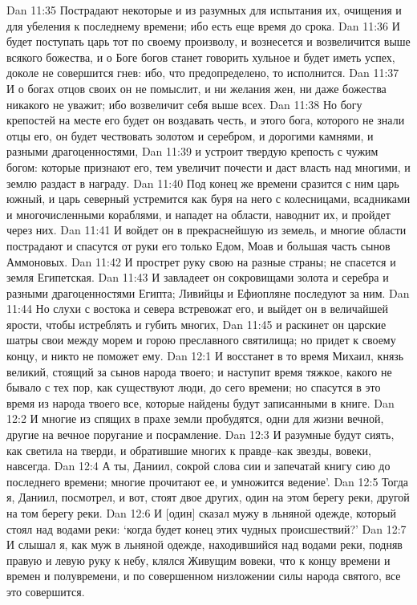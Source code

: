 Dan 11:35  Пострадают некоторые и из разумных для испытания их, очищения и для убеления к последнему времени; ибо есть еще время до срока.
Dan 11:36  И будет поступать царь тот по своему произволу, и вознесется и возвеличится выше всякого божества, и о Боге богов станет говорить хульное и будет иметь успех, доколе не совершится гнев: ибо, что предопределено, то исполнится.
Dan 11:37  И о богах отцов своих он не помыслит, и ни желания жен, ни даже божества никакого не уважит; ибо возвеличит себя выше всех.
Dan 11:38  Но богу крепостей на месте его будет он воздавать честь, и этого бога, которого не знали отцы его, он будет чествовать золотом и серебром, и дорогими камнями, и разными драгоценностями,
Dan 11:39  и устроит твердую крепость с чужим богом: которые признают его, тем увеличит почести и даст власть над многими, и землю раздаст в награду.
Dan 11:40  Под конец же времени сразится с ним царь южный, и царь северный устремится как буря на него с колесницами, всадниками и многочисленными кораблями, и нападет на области, наводнит их, и пройдет через них.
Dan 11:41  И войдет он в прекраснейшую из земель, и многие области пострадают и спасутся от руки его только Едом, Моав и большая часть сынов Аммоновых.
Dan 11:42  И прострет руку свою на разные страны; не спасется и земля Египетская.
Dan 11:43  И завладеет он сокровищами золота и серебра и разными драгоценностями Египта; Ливийцы и Ефиопляне последуют за ним.
Dan 11:44  Но слухи с востока и севера встревожат его, и выйдет он в величайшей ярости, чтобы истреблять и губить многих,
Dan 11:45  и раскинет он царские шатры свои между морем и горою преславного святилища; но придет к своему концу, и никто не поможет ему.
Dan 12:1  И восстанет в то время Михаил, князь великий, стоящий за сынов народа твоего; и наступит время тяжкое, какого не бывало с тех пор, как существуют люди, до сего времени; но спасутся в это время из народа твоего все, которые найдены будут записанными в книге.
Dan 12:2  И многие из спящих в прахе земли пробудятся, одни для жизни вечной, другие на вечное поругание и посрамление.
Dan 12:3  И разумные будут сиять, как светила на тверди, и обратившие многих к правде--как звезды, вовеки, навсегда.
Dan 12:4  А ты, Даниил, сокрой слова сии и запечатай книгу сию до последнего времени; многие прочитают ее, и умножится ведение'.
Dan 12:5  Тогда я, Даниил, посмотрел, и вот, стоят двое других, один на этом берегу реки, другой на том берегу реки.
Dan 12:6  И [один] сказал мужу в льняной одежде, который стоял над водами реки: `когда будет конец этих чудных происшествий?'
Dan 12:7  И слышал я, как муж в льняной одежде, находившийся над водами реки, подняв правую и левую руку к небу, клялся Живущим вовеки, что к концу времени и времен и полувремени, и по совершенном низложении силы народа святого, все это совершится.
